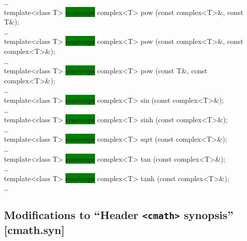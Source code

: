 \documentclass[prd,twocolumn,amsmath,amssymb,nofootinbib,eqsecnum]{revtex4-1}
\newcommand{\header}[1]{{\tt <#1>}}
\newcommand{\highlight}[1]{\colorbox{green}{\!\!\!\! #1}}
\begin{document}
{	\ldots\\

  	template<class T> \highlight{constexpr} complex<T> pow  (const complex<T>\&, const T\&);\\

	\ldots\\
 
 	template<class T> \highlight{constexpr} complex<T> pow  (const complex<T>\&, const complex<T>\&);\\
	
	\ldots\\

	template<class T> \highlight{constexpr} complex<T> pow  (const T\&, const complex<T>\&);\\

	\ldots\\

  	template<class T> \highlight{constexpr} complex<T> sin  (const complex<T>\&);\\

	\ldots\\
	
	template<class T> \highlight{constexpr} complex<T> sinh (const complex<T>\&);\\

	\ldots\\
 
 	template<class T> \highlight{constexpr} complex<T> sqrt (const complex<T>\&);\\

	\ldots\\
 
 	template<class T> \highlight{constexpr} complex<T> tan  (const complex<T>\&);\\

	\ldots\\

	template<class T> \highlight{constexpr} complex<T> tanh (const complex<T>\&);\\

	\ldots\\
}

\subsection{Modifications to  ``Header \header{cmath} synopsis'' [cmath.syn]}
\end{document}
